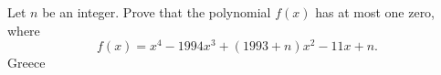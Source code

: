 Let $n$ be an integer. Prove that the polynomial $f(x)$ has at most one zero, where \[ f(x) = x^4 - 1994 x^3 + (1993+n)x^2 - 11x + n .  \]Greece